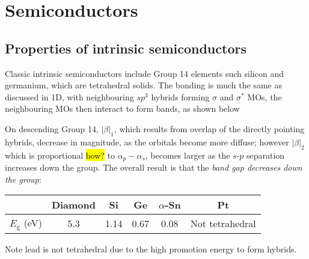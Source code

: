 \section{Semiconductors}


\subsection{Properties of intrinsic semiconductors}
Classic intrinsic semiconductors include Group 14 elements such silicon and germanium, which are tetrahedral solids. The bonding is much the same as discussed in 1D, with neighbouring $sp^3$ hybrids forming $\sigma$ and $\sigma^*$ MOs, the neighbouring MOs then interact to form bands, as shown below
\begin{center}
\end{center}
On descending Group 14, $|\beta|_1$, which results from overlap of the directly pointing hybrids, decrease in magnitude, as the orbitals become more diffuse; however $|\beta|_2$ which is proportional \hl{how?} to $\alpha_p-\alpha_s$, becomes larger as the $s$-$p$ separation increases down the group. The overall result is that the \emph{band gap decreases down the group}:
\begin{center}
	\begin{tabular}{cccccc}
	\hline
	 & Diamond & Si & Ge & $\alpha$-Sn & Pt\\
	 \hline
	 $E_{\mathrm{g}}$ (eV) & 5.3 & 1.14 & 0.67 & 0.08 & Not tetrahedral\\
	 \hline
	\end{tabular}
\end{center}
Note lead is not tetrahedral due to the high promotion energy to form hybrids.


